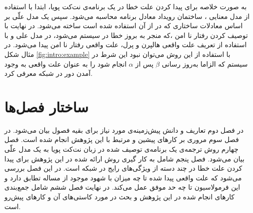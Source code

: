 به صورت خلاصه برای پیدا کردن علت خطا در یک برنامه‌ی نت‌کت پویا، ابتدا با استفاده از مدل‌ معنایی
، ساختمان رویداد معادل برنامه محاسبه می‌شود. 
سپس یک مدل علّی
 بر اساس معادلات ساختاری
که در 
\cite{hp}
از آن استفاده شده است ساخته می‌شود.
در نهایت با توصیف کردن رفتار نا امن
،که منجر به بروز خطا در سیستم می‌شود، در مدل علی و با استفاده از تعریف علت واقعی هالپرن و پرل، علت واقعی رفتار نا امن پیدا می‌شود.
در مثال شکل 
\ref{fig:intro:example}
با استفاده از این روش می‌توان نبود این شرط در سیستم که الزاما به‌روز رسانی 
$\beta$
پس از 
$\alpha$
انجام شود را به عنوان علت واقعی به وجود آمدن دور در شبکه معرفی کرد.

\section{ساختار فصل‌ها}
در فصل دوم تعاریف و دانش پیش‌زمینه‌ی مورد نیاز برای بقیه فصول 
بیان می‌شود.
 در فصل سوم مروری بر کار‌های پیشین و مرتبط با این پژوهش انجام شده است.
فصل چهارم روش ترجمه‌ی یک برنامه‌ی توصیف شده در زبان نت‌کت پویا به یک مدل علّی
بیان می‌شود.
فصل پنجم شامل به کار گیری روش ارائه شده در این پژوهش برای پیدا کردن علت خطا در چند دسته از ویژگی‌های رایج در شبکه است. در این فصل بررسی می‌شود که علت واقعی پیدا شده تا چه میزان با شهود موجود از مساله تطابق دارد و این فرمولاسیون تا چه حد موفق عمل می‌کند.
در نهایت فصل ششم شامل جمع‌بندی کار‌های انجام شده در این پژوهش و بحث در مورد کاستی‌های آن و کار‌های پیش‌رو است.

